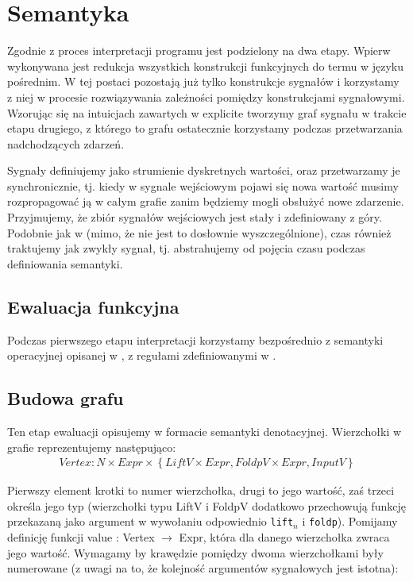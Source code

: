 \documentclass[11pt,leqno]{article}
\begin{document}
\section{Semantyka}

Zgodnie z \cite[p.~3.3]{CC} proces interpretacji programu jest podzielony na dwa etapy. Wpierw wykonywana jest redukcja wszystkich konstrukcji funkcyjnych do termu w języku pośrednim. W tej postaci  pozostają już tylko konstrukcje sygnałów i korzystamy z niej w procesie rozwiązywania zależności pomiędzy konstrukcjami sygnałowymi. Wzorując się na intuicjach zawartych w \cite[p.~3.3.2]{CC} explicite tworzymy graf sygnału w trakcie etapu drugiego, z którego to grafu ostatecznie korzystamy podczas przetwarzania nadchodzących zdarzeń.


Sygnały definiujemy jako strumienie dyskretnych wartości, oraz przetwarzamy je synchronicznie, tj. kiedy w sygnale wejściowym pojawi się nowa wartość musimy rozpropagować ją w całym grafie zanim będziemy mogli obsłużyć nowe zdarzenie. Przyjmujemy, że zbiór sygnałów wejściowych jest stały i zdefiniowany z góry. Podobnie jak w \nocite{CC} (mimo, że nie jest to dosłownie wyszczególnione), czas również traktujemy jak zwykły sygnał, tj. abstrahujemy od pojęcia czasu podczas definiowania semantyki.

\subsection{Ewaluacja funkcyjna}

Podczas pierwszego etapu interpretacji korzystamy bezpośrednio z semantyki operacyjnej opisanej w \cite[p.~3.3.1]{CC}, z regułami zdefiniowanymi w \cite[fig.~6]{CC}. 

\subsection{Budowa grafu}
Ten etap ewaluacji opisujemy w formacie semantyki denotacyjnej. Wierzchołki w grafie reprezentujemy następująco:
\begin{gather}
Vertex : N \times Expr \times \left\{ {LiftV \times Expr, FoldpV \times Expr, InputV}\right\} 
\end{gather}

Pierwszy element krotki to numer wierzchołka, drugi to jego wartość, zaś trzeci określa jego typ (wierzchołki typu LiftV i FoldpV dodatkowo przechowują funkcję przekazaną jako argument w wywołaniu odpowiednio \texttt{lift$_{n}$} i \texttt{foldp}). Pomijamy definicję funkcji value : Vertex $\rightarrow$ Expr, która dla danego wierzchołka zwraca jego wartość. Wymagamy by krawędzie pomiędzy dwoma wierzchołkami były numerowane (z uwagi na to, że kolejność argumentów sygnałowych jest istotna):
\end{document}
